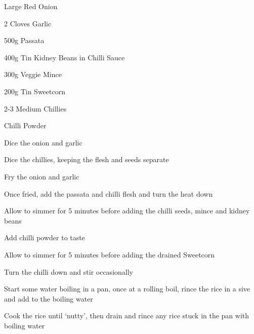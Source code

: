 {
  \item {} Large Red Onion
  \item 2 Cloves Garlic
  \item 500g Passata
  \item 400g Tin Kidney Beans in Chilli Sauce
  \item 300g Veggie Mince
  \item 200g Tin Sweetcorn
  \item 2-3 Medium Chillies
  \item Chilli Powder
}{
  \item Dice the onion and garlic
  \item Dice the chillies, keeping the flesh and seeds separate
  \item Fry the onion and garlic
  \item Once fried, add the passata and chilli flesh and turn the heat down
  \item Allow to simmer for 5 minutes before adding the chilli seeds, mince and kidney beans
  \item Add chilli powder to taste
  \item Allow to simmer for 5 minutes before adding the drained Sweetcorn
  \item Turn the chilli down and stir occasionally
  \item Start some water boiling in a pan, once at a rolling boil, rince the rice in a sive and add to the boiling water
  \item Cook the rice until `nutty', then drain and rince any rice stuck in the pan with boiling water
}